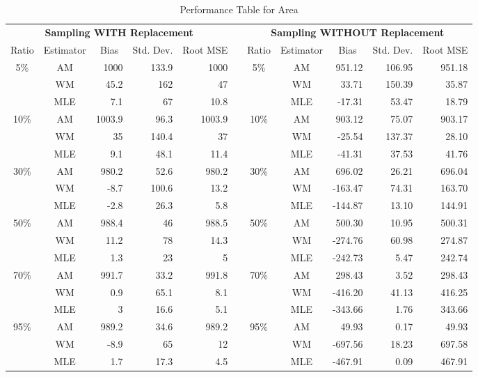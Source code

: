 \documentclass{article}\usepackage[]{graphicx}\usepackage[]{color}
\numberwithin{figure}{subsection} %
\numberwithin{table}{subsection} %
\begin{document}
\begin{table}[!tbp]
{\small
\begin{center}
\begin{tabular}{ccrrrcccrrr}
\hline\hline
\multicolumn{5}{c}{\bfseries Sampling WITH Replacement}&\multicolumn{1}{c}{\bfseries }&\multicolumn{5}{c}{\bfseries Sampling WITHOUT Replacement}\tabularnewline
\cline{1-11}
\multicolumn{1}{c}{Ratio}&\multicolumn{1}{c}{Estimator}&\multicolumn{1}{c}{Bias}&\multicolumn{1}{c}{Std. Dev.}&\multicolumn{1}{c}{Root MSE}&\multicolumn{1}{c}{}&\multicolumn{1}{c}{Ratio}&\multicolumn{1}{c}{Estimator}&\multicolumn{1}{c}{Bias}&\multicolumn{1}{c}{Std. Dev.}&\multicolumn{1}{c}{Root MSE}\tabularnewline
\hline
5\%&AM&1000&133.9&1000&&5\%&AM&951.12&106.95&951.18\tabularnewline
&WM&45.2&162&47&&&WM&33.71&150.39&35.87\tabularnewline
&MLE&7.1&67&10.8&&&MLE&-17.31&53.47&18.79\tabularnewline
10\%&AM&1003.9&96.3&1003.9&&10\%&AM&903.12&75.07&903.17\tabularnewline
&WM&35&140.4&37&&&WM&-25.54&137.37&28.10\tabularnewline
&MLE&9.1&48.1&11.4&&&MLE&-41.31&37.53&41.76\tabularnewline
30\%&AM&980.2&52.6&980.2&&30\%&AM&696.02&26.21&696.04\tabularnewline
&WM&-8.7&100.6&13.2&&&WM&-163.47&74.31&163.70\tabularnewline
&MLE&-2.8&26.3&5.8&&&MLE&-144.87&13.10&144.91\tabularnewline
50\%&AM&988.4&46&988.5&&50\%&AM&500.30&10.95&500.31\tabularnewline
&WM&11.2&78&14.3&&&WM&-274.76&60.98&274.87\tabularnewline
&MLE&1.3&23&5&&&MLE&-242.73&5.47&242.74\tabularnewline
70\%&AM&991.7&33.2&991.8&&70\%&AM&298.43&3.52&298.43\tabularnewline
&WM&0.9&65.1&8.1&&&WM&-416.20&41.13&416.25\tabularnewline
&MLE&3&16.6&5.1&&&MLE&-343.66&1.76&343.66\tabularnewline
95\%&AM&989.2&34.6&989.2&&95\%&AM&49.93&0.17&49.93\tabularnewline
&WM&-8.9&65&12&&&WM&-697.56&18.23&697.58\tabularnewline
&MLE&1.7&17.3&4.5&&&MLE&-467.91&0.09&467.91\tabularnewline
\hline
\end{tabular}
\caption{Performance Table for Area\label{tab_size_est}}\end{center}}
\end{table}

  
\begin{figure}[!htbp]
  \centering

  \end{figure}
\end{document}
